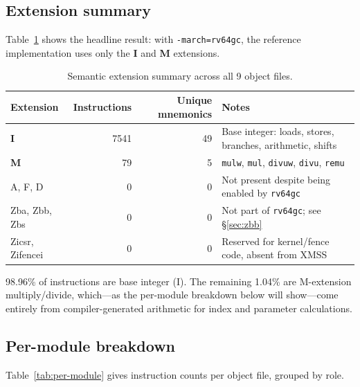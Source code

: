 \documentclass[11pt,a4paper]{article}
\begin{document}
\subsection{Extension summary}

Table~\ref{tab:ext-summary} shows the headline result: with
\texttt{-march=rv64gc}, the reference implementation uses only the
\textbf{I} and \textbf{M} extensions.

\begin{table}[ht]
\centering
\caption{Semantic extension summary across all 9 object files.}
\label{tab:ext-summary}
\begin{tabular}{@{}lrrp{7cm}@{}}
\toprule
Extension & Instructions & Unique mnemonics & Notes \\
\midrule
\textbf{I} & 7541 & 49 & Base integer: loads, stores, branches, arithmetic, shifts \\
\textbf{M} &   79 &  5 & \texttt{mulw}, \texttt{mul}, \texttt{divuw}, \texttt{divu}, \texttt{remu} \\
\midrule
A, F, D        & 0 & 0 & Not present despite being enabled by \texttt{rv64gc} \\
Zba, Zbb, Zbs  & 0 & 0 & Not part of \texttt{rv64gc}; see \S\ref{sec:zbb} \\
Zicsr, Zifencei & 0 & 0 & Reserved for kernel/fence code, absent from XMSS \\
\bottomrule
\end{tabular}
\end{table}

98.96\% of instructions are base integer (I).  The remaining 1.04\%
are M-extension multiply/divide, which---as the per-module breakdown
below will show---come entirely from compiler-generated arithmetic
for index and parameter calculations.

\subsection{Per-module breakdown}

Table~\ref{tab:per-module} gives instruction counts per object file,
grouped by role.
\end{document}
